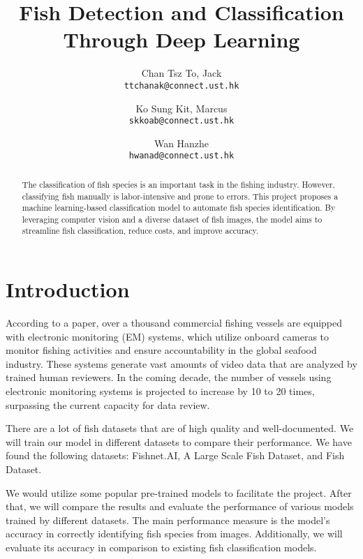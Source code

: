 \documentclass[10pt,twocolumn,letterpaper]{article}
\begin{document}
\title{Fish Detection and Classification Through Deep Learning}

\author{Chan Tsz To, Jack\\
{\tt\small ttchanak@connect.ust.hk}
\and
Ko Sung Kit, Marcus\\
{\tt\small skkoab@connect.ust.hk}
\and
Wan Hanzhe\\
{\tt\small hwanad@connect.ust.hk}
}
\maketitle

\begin{abstract}
The classification of fish species is an important task in the fishing industry. However, classifying fish manually is labor-intensive and prone to errors. This project proposes a machine learning-based classification model to automate fish species identification. By leveraging computer vision and a diverse dataset of fish images, the model aims to streamline fish classification, reduce costs, and improve accuracy.
\end{abstract}

\section{Introduction}
According to a paper\cite{kay2021fishnetopenimagesdatabase}, over a thousand commercial fishing vessels are equipped with electronic monitoring (EM) systems, which utilize onboard cameras to monitor fishing activities and ensure accountability in the global seafood industry. These systems generate vast amounts of video data that are analyzed by trained human reviewers. In the coming decade, the number of vessels using electronic monitoring systems is projected to increase by 10 to 20 times, surpassing the current capacity for data review.

There are a lot of fish datasets that are of high quality and well-documented. We will train our model in different datasets to compare their performance. We have found the following datasets: Fishnet.AI, A Large Scale Fish Dataset, and Fish Dataset.

We would utilize some popular pre-trained models to facilitate the project. After that, we will compare the results and evaluate the performance of various models trained by different datasets. The main performance measure is the model's accuracy in correctly identifying fish species from images. Additionally, we will evaluate its accuracy in comparison to existing fish classification models.
{\small


}
\end{document}
